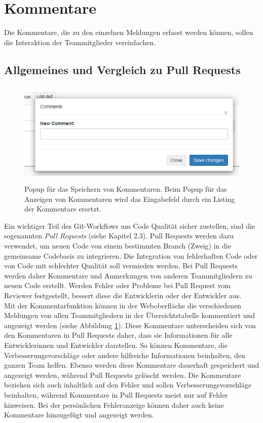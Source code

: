 \section{Kommentare}
Die Kommentare, die zu den einzelnen Meldungen erfasst werden können, sollen die Interaktion der Teammitglieder vereinfachen.
\subsection{Allgemeines und Vergleich zu Pull Requests}
\begin{figure}[tp]
  \centering
  \includegraphics[height=5cm]{images/popup.PNG}
 \caption[Popup für das Speichern von Kommentaren]{Popup für das Speichern von Kommentaren. Beim Popup für das Anzeigen von Kommentaren wird das Eingabefeld durch ein Listing der Kommentare ersetzt.}
  \label{fig:table}
\end{figure}
Ein wichtiger Teil des Git-Workflows um Code Qualität sicher zustellen, sind die sogenannten \textit{Pull Requests} (siehe Kapitel 2.3). Pull Requests werden dazu verwendet, um neuen Code von einem bestimmten Branch (Zweig) in die gemeinsame Codebasis zu integrieren. Die Integration von fehlerhaften Code oder von Code mit schlechter Qualität soll vermieden werden. Bei Pull Requests werden daher Kommentare und Anmerkungen von anderen Teammitgliedern zu neuen Code erstellt. Werden Fehler oder Probleme bei Pull Request vom Reviewer festgestellt, bessert diese die Entwicklerin oder der Entwickler aus. \\ Mit der Kommentarfunktion können in der Weboberfläche die verschiedenen Meldungen von allen Teammitgliedern in der Übersichtstabelle kommentiert und angezeigt werden (siehe Abbildung \ref{fig:table}). Diese Kommentare unterscheiden sich von den Kommentaren in Pull Requests daher, dass sie Informationen für alle Entwicklerinnen und Entwickler darstellen. So können Kommentare, die Verbesserungsvorschläge oder andere hilfreiche Informationen beinhalten, den ganzen Team helfen. Ebenso werden diese Kommentare dauerhaft gespeichert und angezeigt werden, während Pull Requests gelöscht werden. Die Kommentare beziehen sich auch inhaltlich auf den Fehler und sollen Verbesserungsvorschläge beinhalten, während Kommentare in Pull Requests meist nur auf Fehler hinweisen. Bei der persönlichen Fehleranzeige können daher auch keine Kommentare hinzugefügt und angezeigt werden.
